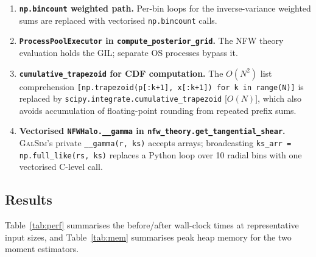 \begin{enumerate}
  \item \textbf{\texttt{np.bincount} weighted path.}
    Per-bin loops for the inverse-variance weighted sums are replaced with
    vectorised \texttt{np.bincount} calls.

  \item \textbf{\texttt{ProcessPoolExecutor} in \texttt{compute\_posterior\_grid}.}
    The NFW theory evaluation holds the GIL; separate OS processes bypass it.

  \item \textbf{\texttt{cumulative\_trapezoid} for CDF computation.}
    The $O(N^2)$ list comprehension
    \texttt{[np.trapezoid(p[:k+1], x[:k+1]) for k in range(N)]} is replaced
    by \texttt{scipy.integrate.cumulative\_trapezoid} [$O(N)$], which also
    avoids accumulation of floating-point rounding from repeated prefix sums.

  \item \textbf{Vectorised \texttt{NFWHalo.\_\_gamma} in
        \texttt{nfw\_theory.get\_tangential\_shear}.}
    \textsc{GalSim}'s private \texttt{\_\_gamma(r, ks)} accepts arrays;
    broadcasting \texttt{ks\_arr = np.full\_like(rs, ks)} replaces a Python
    loop over 10 radial bins with one vectorised C-level call.
\end{enumerate}

\subsection{Results}

Table~\ref{tab:perf} summarises the before/after wall-clock times at
representative input sizes, and Table~\ref{tab:mem} summarises peak heap
memory for the two moment estimators.

